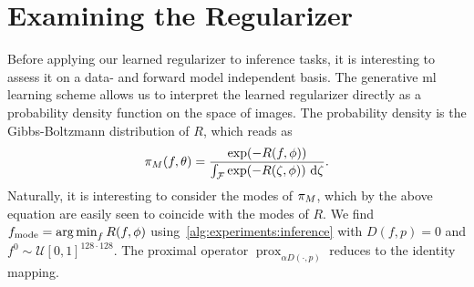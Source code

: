 \documentclass[../ml-ct.tex]{subfiles}
\begin{document}
\section{Examining the Regularizer}
Before applying our learned regularizer to inference tasks, it is interesting to assess it on a data- and forward model independent basis.
The generative \gls{ml} learning scheme allows us to interpret the learned regularizer directly as a probability density function on the space of images.
The probability density is the Gibbs-Boltzmann distribution of \( R \), which reads as
\begin{equation}
	\pdf{M}(f, \theta) = \frac{\exp(-R(f, \params))}{\int_{\set{F}} \exp(-R(\zeta, \params))\ \dd \zeta}.%
\end{equation}
Naturally, it is interesting to consider the modes of \( \pi_{M} \), which by the above equation are easily seen to coincide with the modes of \( R \).
We find \( f_{\text{mode}} = \operatorname*{arg\,min}_f R(f, \phi) \) using~\cref{alg:experiments:inference} with \( D(f, p) = 0 \) and \( f^0 \sim \mathcal{U}{[0, 1]}^{128\cdot128} \).
The proximal operator \( \operatorname{prox}_{\alpha D(\cdot, p)} \) reduces to the identity mapping.
\end{document}
